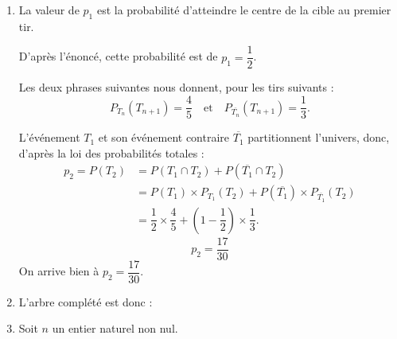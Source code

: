 \begin{enumerate}
\item La valeur de $p_1$ est la probabilité d'atteindre le centre de la cible au premier tir.

D'après l'énoncé, cette probabilité est de $p_1=\dfrac12$.

Les deux phrases suivantes nous donnent, pour les tirs suivants :
\[
P_{T_n}(T_{n+1})=\dfrac45 \quad \text{et} \quad P_{\overline{T_n}}(T_{n+1})=\dfrac13.
\]

L'événement $T_1$ et son événement contraire $\overline{T_1}$ partitionnent l'univers, donc, d'après la loi des probabilités totales :
\[
\begin{aligned}
p_2=P(T_2)&=P(T_1\cap T_2)+P(\overline{T_1}\cap T_2)\\
&=P(T_1)\times P_{T_1}(T_2)+P(\overline{T_1})\times P_{\overline{T_1}}(T_2)\\
&=\dfrac12\times \dfrac45+\left(1-\dfrac12\right)\times \dfrac13.
\end{aligned}
\]
\[
p_2=\dfrac{17}{30}
\]
On arrive bien à $p_2=\dfrac{17}{30}$.

\item L'arbre complété est donc :

\begin{center}
\end{center}

\item Soit $n$ un entier naturel non nul.


\end{enumerate}
